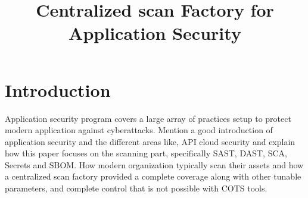 \documentclass[conference,compsoc]{IEEEtran}
\begin{document}
\title{Centralized scan Factory for Application Security}
\author{
\and
{}
\and
{}
}
\maketitle
\begin{abstract}
\end{abstract}
\IEEEpeerreviewmaketitle

\section{Introduction}
Application security program covers a large array of practices setup to protect
modern application against cyberattacks. Mention a good introduction of application
security and the different areas like, API cloud security and explain how this
paper focuses on the scanning part, specifically SAST, DAST, SCA, Secrets and
SBOM. How modern organization typically scan their assets and how a centralized
scan factory provided a complete coverage along with other tunable parameters,
and complete control that is not possible with COTS tools.
\newpage


\end{document}
